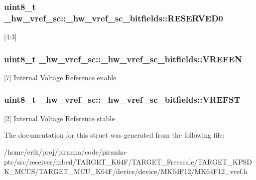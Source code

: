 \subsubsection[{\texorpdfstring{R\+E\+S\+E\+R\+V\+E\+D0}{RESERVED0}}]{\setlength{\rightskip}{0pt plus 5cm}uint8\+\_\+t \+\_\+hw\+\_\+vref\+\_\+sc\+::\+\_\+hw\+\_\+vref\+\_\+sc\+\_\+bitfields\+::\+R\+E\+S\+E\+R\+V\+E\+D0}\hypertarget{struct__hw__vref__sc_1_1__hw__vref__sc__bitfields_a00f7d40c62417d70d7deba557077b0db}{}\label{struct__hw__vref__sc_1_1__hw__vref__sc__bitfields_a00f7d40c62417d70d7deba557077b0db}
\mbox{[}4\+:3\mbox{]} 
\subsubsection[{\texorpdfstring{V\+R\+E\+F\+EN}{VREFEN}}]{\setlength{\rightskip}{0pt plus 5cm}uint8\+\_\+t \+\_\+hw\+\_\+vref\+\_\+sc\+::\+\_\+hw\+\_\+vref\+\_\+sc\+\_\+bitfields\+::\+V\+R\+E\+F\+EN}\hypertarget{struct__hw__vref__sc_1_1__hw__vref__sc__bitfields_ad39d905cacc01ee6c6789f478b962929}{}\label{struct__hw__vref__sc_1_1__hw__vref__sc__bitfields_ad39d905cacc01ee6c6789f478b962929}
\mbox{[}7\mbox{]} Internal Voltage Reference enable 
\subsubsection[{\texorpdfstring{V\+R\+E\+F\+ST}{VREFST}}]{\setlength{\rightskip}{0pt plus 5cm}uint8\+\_\+t \+\_\+hw\+\_\+vref\+\_\+sc\+::\+\_\+hw\+\_\+vref\+\_\+sc\+\_\+bitfields\+::\+V\+R\+E\+F\+ST}\hypertarget{struct__hw__vref__sc_1_1__hw__vref__sc__bitfields_a4fd4cd90f8ecd588c18ba21c39de529f}{}\label{struct__hw__vref__sc_1_1__hw__vref__sc__bitfields_a4fd4cd90f8ecd588c18ba21c39de529f}
\mbox{[}2\mbox{]} Internal Voltage Reference stable 

The documentation for this struct was generated from the following file\+:\begin{DoxyCompactItemize}
\item 
/home/erik/proj/piranha/code/piranha-\/ptc/src/receiver/mbed/\+T\+A\+R\+G\+E\+T\+\_\+\+K64\+F/\+T\+A\+R\+G\+E\+T\+\_\+\+Freescale/\+T\+A\+R\+G\+E\+T\+\_\+\+K\+P\+S\+D\+K\+\_\+\+M\+C\+U\+S/\+T\+A\+R\+G\+E\+T\+\_\+\+M\+C\+U\+\_\+\+K64\+F/device/device/\+M\+K64\+F12/M\+K64\+F12\+\_\+vref.\+h\end{DoxyCompactItemize}
